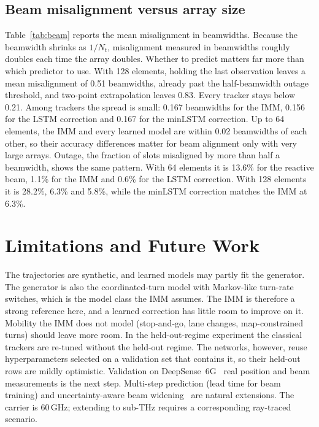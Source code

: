 \documentclass[conference]{IEEEtran}
\newcommand{\todo}[1]{\textcolor{red}{[TODO: #1]}}
\begin{document}
\subsection{Beam misalignment versus array size}
\IfFileExists{tables/beam.tex}{}{\todo{run beam\_eval.py}}
Table~\ref{tab:beam} reports the mean misalignment in beamwidths. Because the
beamwidth shrinks as $1/N_t$, misalignment measured in beamwidths roughly
doubles each time the array doubles. Whether to predict matters far more than
which predictor to use. With 128 elements, holding the last observation leaves
a mean misalignment of 0.51 beamwidths, already past the half-beamwidth outage
threshold, and two-point extrapolation leaves 0.83. Every tracker stays below
0.21. Among trackers the spread is small: 0.167 beamwidths for the IMM, 0.156
for the LSTM correction and 0.167 for the minLSTM correction. Up to 64
elements, the IMM and every learned model are within 0.02 beamwidths of each
other, so their accuracy differences matter for beam alignment only with
very large arrays. Outage, the fraction of slots misaligned by more than half
a beamwidth, shows the same pattern. With 64 elements it is 13.6\% for the
reactive beam, 1.1\% for the IMM and 0.6\% for the LSTM correction. With 128
elements it is 28.2\%, 6.3\% and 5.8\%, while the minLSTM correction matches
the IMM at 6.3\%.

\section{Limitations and Future Work}
The trajectories are synthetic, and learned models may partly fit the
generator. The generator is also the coordinated-turn model with Markov-like
turn-rate switches, which is the model class the IMM assumes. The IMM is
therefore a strong reference here, and a learned correction has little room to
improve on it. Mobility the IMM does not model (stop-and-go, lane changes,
map-constrained turns) should leave more room. In the held-out-regime experiment the classical trackers are
re-tuned without the held-out regime. The networks, however, reuse
hyperparameters selected on a validation set that contains it, so their
held-out rows are mildly optimistic. Validation on DeepSense~6G~\cite{alkhateeb2023deepsense} real
position and beam measurements is the next step. Multi-step prediction (lead
time for beam training) and uncertainty-aware beam widening~\cite{beamguard2026}
are natural extensions. The carrier is 60\,GHz; extending to sub-THz requires
a corresponding ray-traced scenario.
\end{document}
